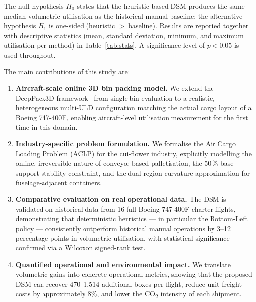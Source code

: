 The null hypothesis $H_0$ states that the heuristic-based DSM produces
the same median volumetric utilisation as the historical manual baseline;
the alternative hypothesis $H_1$ is one-sided (heuristic $>$ baseline).
Results are reported together with descriptive statistics
(mean, standard deviation, minimum, and maximum utilisation per method)
in Table~\ref{tab:stats}.
A significance level of $p < 0.05$ is used throughout.





\noindent
The main contributions of this study are:
\begin{enumerate}
  \item \textbf{Aircraft-scale online 3D bin packing model.}
        We extend the DeepPack3D framework~\citep{Tsang2025} from
        single-bin evaluation to a realistic, heterogeneous multi-ULD
        configuration matching the actual cargo layout of a Boeing
        747-400F, enabling aircraft-level utilisation measurement for
        the first time in this domain.
  \item \textbf{Industry-specific problem formulation.}
        We formalise the Air Cargo Loading Problem (ACLP) for the
        cut-flower industry, explicitly modelling the online, irreversible
        nature of conveyor-based palletisation, the 50\,\% base-support
        stability constraint, and the dual-region curvature approximation
        for fuselage-adjacent containers.
  \item \textbf{Comparative evaluation on real operational data.}
        The DSM is validated on historical data from 16 full Boeing
        747-400F charter flights, demonstrating that deterministic
        heuristics — in particular the Bottom-Left policy — consistently
        outperform historical manual operations by 3--12 percentage
        points in volumetric utilisation, with statistical significance
        confirmed via a Wilcoxon signed-rank test.
  \item \textbf{Quantified operational and environmental impact.}
        We translate volumetric gains into concrete operational metrics,
        showing that the proposed DSM can recover 470--1,514 additional
        boxes per flight, reduce unit freight costs by approximately 8\%,
        and lower the CO\textsubscript{2} intensity of each shipment.
\end{enumerate}


